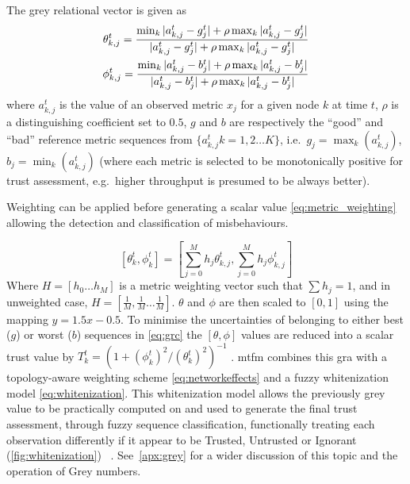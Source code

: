 The grey relational vector is given as
%
\begin{align}
  \label{eq:grc}
  \theta_{k,j}^t = \frac{\min_k|a_{k,j}^t - g_j^t| + \rho \max_k|a_{k,j}^t-g_j^t|}{|a_{k,j}^t-g_j^t| + \rho \max_k|a_{k,j}^t-g_j^t|} \\
  \phi_{k,j}^t = \frac{\min_k|a_{k,j}^t - b_j^t| + \rho \max_k|a_{k,j}^t-b_j^t|}{|a_{k,j}^t-b_j^t| + \rho \max_k|a_{k,j}^t-b_j^t|} \notag 
\end{align}
%
where $a_{k,j}^t$ is the value of an observed metric $x_j$ for a given node $k$ at time $t$, $\rho$ is a distinguishing coefficient set to $0.5$, $g$ and $b$ are respectively the ``good'' and ``bad'' reference metric sequences from $\{a_{k,j}^t k=1,2\dots K\}$, i.e.\ $g_j=\max_k({a_{k,j}^t})$,  $b_j=\min_k({a_{k,j}^t})$ (where each metric is selected to be monotonically positive for trust assessment, e.g.\ higher throughput is presumed to be always better).

Weighting can be applied before generating a scalar value \eqref{eq:metric_weighting} allowing the detection and classification of misbehaviours.

%
\begin{equation}
  \label{eq:metric_weighting}
  [\theta_k^t, \phi_k^t] = \left[\sum_{j=0}^M h_j \theta_{k,j}^t,\sum_{j=0}^M h_j \phi_{k,j}^t \right]
\end{equation}
%
Where $H=[h_0\dots h_M]$ is a metric weighting vector such that $\sum h_j = 1$, and in unweighted case, $H=[\frac{1}{M},\frac{1}{M}\dots\frac{1}{M}]$.
$\theta$ and $\phi$ are then scaled to $[0,1]$ using the mapping $y = 1.5 x - 0.5$.
To minimise the uncertainties of belonging to either best ($g$) or worst ($b$) sequences in \eqref{eq:grc} the $[\theta,\phi]$ values are reduced into a scalar trust value by $T_k^t = ({1+{(\phi_k^t)^2}/{(\theta_k^t)^2}})^{-1}$ \cite{Hong2010}.
\gls{mtfm} combines this \gls{gra} with a topology-aware weighting scheme \eqref{eq:networkeffects} and a fuzzy whitenization model \eqref{eq:whitenization}.
This whitenization model allows the previously grey value to be practically computed on and used to generate the final trust assessment, through fuzzy sequence classification, functionally treating each observation differently if it appear to be Trusted, Untrusted or Ignorant (\autoref{fig:whitenization}) ~\cite{Liu2011}.
See~\autoref{apx:grey} for a wider discussion of this topic and the operation of Grey numbers.

